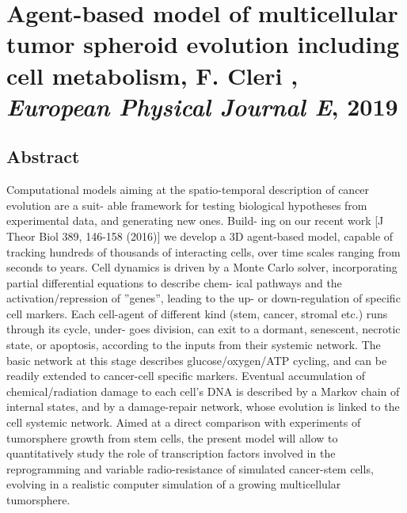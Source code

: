 \documentclass[11pt,a4paper]{article}
\begin{document}
\section*{Agent-based model of multicellular tumor spheroid evolution including cell metabolism, F. Cleri , \textit{European Physical Journal E}, 2019}
\subsection*{Abstract}
Computational models aiming at the spatio-temporal description of cancer evolution are a suit-
able framework for testing biological hypotheses from experimental data, and generating new ones. Build-
ing on our recent work [J Theor Biol 389, 146-158 (2016)] we develop a 3D agent-based model, capable of
tracking hundreds of thousands of interacting cells, over time scales ranging from seconds to years. Cell
dynamics is driven by a Monte Carlo solver, incorporating partial differential equations to describe chem-
ical pathways and the activation/repression of ”genes”, leading to the up- or down-regulation of specific
cell markers. Each cell-agent of different kind (stem, cancer, stromal etc.) runs through its cycle, under-
goes division, can exit to a dormant, senescent, necrotic state, or apoptosis, according to the inputs from
their systemic network. The basic network at this stage describes glucose/oxygen/ATP cycling, and can
be readily extended to cancer-cell specific markers. Eventual accumulation of chemical/radiation damage
to each cell’s DNA is described by a Markov chain of internal states, and by a damage-repair network,
whose evolution is linked to the cell systemic network. Aimed at a direct comparison with experiments
of tumorsphere growth from stem cells, the present model will allow to quantitatively study the role of
transcription factors involved in the reprogramming and variable radio-resistance of simulated cancer-stem
cells, evolving in a realistic computer simulation of a growing multicellular tumorsphere.
\end{document}
